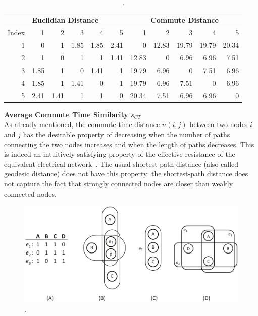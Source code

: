 \begin{table}[ht]
\begin{tabular}{r|r|r|r|r|r || r|r|r|r|r}
\hline\hline
\multicolumn{6}{c||}{Euclidian Distance}	&	\multicolumn{5}{c}{Commute Distance}		\\
\hline\hline							
Index	&	1	&	2	&	3	&	4	&	5	&	1	&	2	&	3	&	4	&	5	\\
\hline
1	&	0	&	1	&	1.85	&	1.85	&	2.41	&	0	&	12.83	&	19.79	&	19.79	&	20.34	\\
\hline
2	&	1	&	0	&	1	&	1	&	1.41	&	12.83	&	0	&	6.96	&	6.96	&	7.51	\\
\hline
3	&	1.85	&	1	&	0	&	1.41	&	1	&	19.79	&	6.96	&	0	&	7.51	&	6.96	\\
\hline
4	&	1.85	&	1	&	1.41	&	0	&	1	&	19.79	&	6.96	&	7.51	&	0	&	6.96	\\
\hline
5	&	2.41	&	1.41	&	1	&	1	&	0	&	20.34	&	7.51	&	6.96	&	6.96	&	0	\\
\hline\hline
\end{tabular}
\caption{\label{tbl:comp-eucl-comm} .}
\end{table}
\textbf{Average Commute Time Similarity $s_{CT}$}\\

As already mentioned, the commute-time distance $n(i,j)$ between two nodes $i$ and $j$ has the desirable property of decreasing when the number of paths connecting the two nodes increases and when the length of paths decreases. This is indeed an intuitively satisfying property of the effective resistance of the equivalent electrical network~\cite{Doyle}. The usual shortest-path distance (also called geodesic distance) does not have this property: the shortest-path distance does not capture the fact that strongly connected nodes are closer than weakly connected nodes.


\begin{figure}[tbh]
\centering
\includegraphics[width=\textwidth]{fig/hypergraph-coarsening.eps}
\caption{\label{fig:hypergraph-coarsening} .}
\end{figure}

